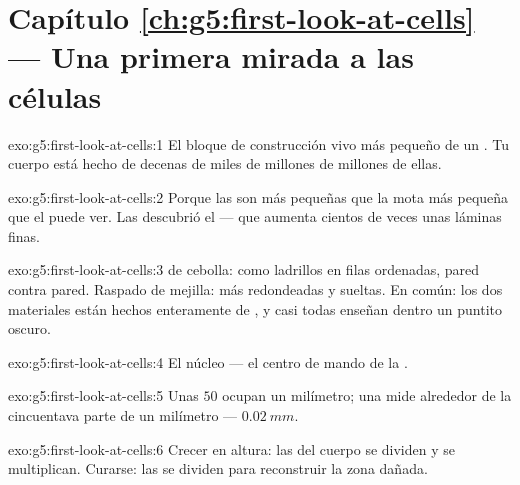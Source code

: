\section*{Capítulo \ref{ch:g5:first-look-at-cells} --- Una primera mirada a las células}

\begin{solution}{exo:g5:first-look-at-cells:1}
El bloque de construcción vivo más pequeño de un . Tu cuerpo
está hecho de decenas de miles de millones de millones de ellas.
\end{solution}

\begin{solution}{exo:g5:first-look-at-cells:2}
Porque las  son más pequeñas que la mota más pequeña que el 
puede ver. Las descubrió el  --- que aumenta cientos de
veces unas láminas finas.
\end{solution}

\begin{solution}{exo:g5:first-look-at-cells:3}
 de cebolla:  como ladrillos en filas ordenadas, pared
contra pared. Raspado de mejilla:  más redondeadas y sueltas.
En común: los dos materiales están hechos enteramente de , y
casi todas enseñan dentro un puntito oscuro.
\end{solution}

\begin{solution}{exo:g5:first-look-at-cells:4}
El núcleo --- el centro de mando de la .
\end{solution}

\begin{solution}{exo:g5:first-look-at-cells:5}
Unas $50$  ocupan un milímetro; una  mide alrededor de la
cincuentava parte de un milímetro --- $\qty{0.02}{mm}$.
\end{solution}

\begin{solution}{exo:g5:first-look-at-cells:6}
Crecer en altura: las  del cuerpo se dividen y se multiplican.
Curarse: las  se dividen para reconstruir la zona dañada.
\end{solution}

